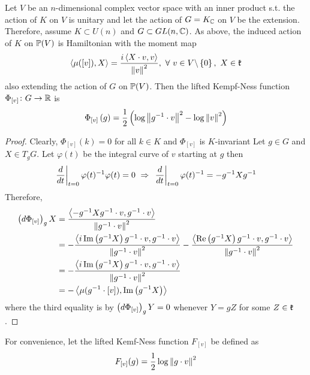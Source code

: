 \documentclass[a4paper,12pt]{article}
\begin{document}
	\begin{exam}
		Let $V$ be an $n$-dimensional complex vector space with an inner product s.t. the action of $K$ on $V$ is unitary and let the action of $G = K_{\mathbb{C}}$ on $V$ be the extension. Therefore, assume $K \subset U(n)$ and $G \subset GL(n,\mathbb{C})$. As above, the induced action of $K$ on $\mathbb{P}(V)$ is Hamiltonian with the moment map
		\begin{equation*}
			\left\langle \mu([v]),X \right\rangle = \frac{i\left\langle X\cdot v, v \right\rangle}{\left\lVert v\right\lVert^2},~\forall~v\in V\backslash \left\{0\right\},~X\in \mathfrak{k}
		\end{equation*}
		also extending the action of $G$ on $\mathbb{P}(V)$. Then the lifted Kempf-Ness function $\Phi_{[v]} \colon G \rightarrow \mathbb{R}$ is
		\begin{equation*}
			\Phi_{[v]}\left(g\right) = \frac{1}{2} \left(\log\left\lVert g^{-1}\cdot v\right\lVert^2-\log\left\lVert v\right\lVert^2\right)
		\end{equation*}
		\begin{proof}
			Clearly, $\Phi_{[v]}(k) = 0$ for all $k \in K$ and $\Phi_{[v]}$ is $K$-invariant
			Let $g \in G$ and $X \in T_gG$. Let $\varphi(t)$ be the integral curve of $v$ starting at $g$ then
			\begin{equation*}
				\left.\frac{d}{dt}\right\lvert_{t=0} \varphi(t)^{-1}\varphi(t) = 0~\Rightarrow~ \left.\frac{d}{dt}\right\lvert_{t=0} \varphi(t)^{-1} = -g^{-1}Xg^{-1}
			\end{equation*}
			Therefore,
			\begin{equation*}
				\begin{split}
					\left(d\Phi_{[v]}\right)_gX &= \frac{\left\langle -g^{-1}Xg^{-1}\cdot v,g^{-1} \cdot v \right\rangle}{\left\lVert g^{-1}\cdot v\right\lVert^2}\\
					&=-\frac{\left\langle i\operatorname{Im}\left(g^{-1}X\right)g^{-1}\cdot v,g^{-1} \cdot v \right\rangle}{\left\lVert g^{-1}\cdot v\right\lVert^2}-\frac{\left\langle \operatorname{Re}\left(g^{-1}X\right)g^{-1}\cdot v,g^{-1} \cdot v \right\rangle}{\left\lVert g^{-1}\cdot v\right\lVert^2}\\
					&=-\frac{\left\langle i\operatorname{Im}\left(g^{-1}X\right)g^{-1}\cdot v,g^{-1} \cdot v \right\rangle}{\left\lVert g^{-1}\cdot v\right\lVert^2} \\
					&= -\left\langle \mu(g^{-1} \cdot [v]),\operatorname{Im}\left(g^{-1}X\right) \right\rangle
				\end{split}
			\end{equation*}
			where the third equality is by $\left(d\Phi_{[v]}\right)_gY = 0$ whenever $Y = gZ$ for some $Z \in \mathfrak{k}$.
		\end{proof}
		\begin{rem}
			For convenience, let the lifted Kemf-Ness function $F_{[v]}$ be defined as
			\begin{equation*}
				F_{[v]}(g) = \frac{1}{2}\log{\norm{g\cdot v}^2}

\end{equation*}
\end{rem}
\end{exam}
\end{document}

